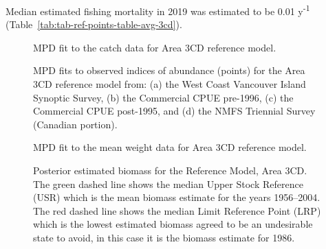 \documentclass[11pt]{book}
\begin{document}
Median estimated fishing mortality in 2019 was estimated to be 0.01 y\textsuperscript{-1} (Table~\ref{tab:tab-ref-points-table-avg-3cd}).
\begin{figure}[htb]

{\centering {} 

}

\caption{MPD fit to the catch data for Area 3CD reference model.}\label{fig:summary-fig-base-catch-fit-3cd}
\end{figure}
\begin{figure}[htb]

{\centering {} 

}

\caption{MPD fits to observed indices of abundance (points) for the Area 3CD reference model from: (a) the West Coast Vancouver Island Synoptic Survey, (b) the Commercial CPUE pre-1996, (c) the Commercial CPUE post-1995, and (d) the NMFS Triennial Survey (Canadian portion).}\label{fig:summary-fig-base-index-fits-3cd}
\end{figure}
\begin{figure}[htb]

{\centering {} 

}

\caption{MPD fit to the mean weight data for Area 3CD reference model.}\label{fig:summary-fig-base-mean-weight-3cd}
\end{figure}
\begin{figure}[htb]

{\centering {} 

}

\caption{Posterior estimated biomass for the Reference Model, Area 3CD. The green dashed line shows the median Upper Stock Reference (USR) which is the mean biomass estimate for the years 1956--2004. The red dashed line shows the median Limit Reference Point (LRP) which is the lowest estimated biomass agreed to be an undesirable state to avoid, in this case it is the biomass estimate for 1986.}\label{fig:summary-fig-base-biomass-3cd}
\end{figure}
\end{document}
